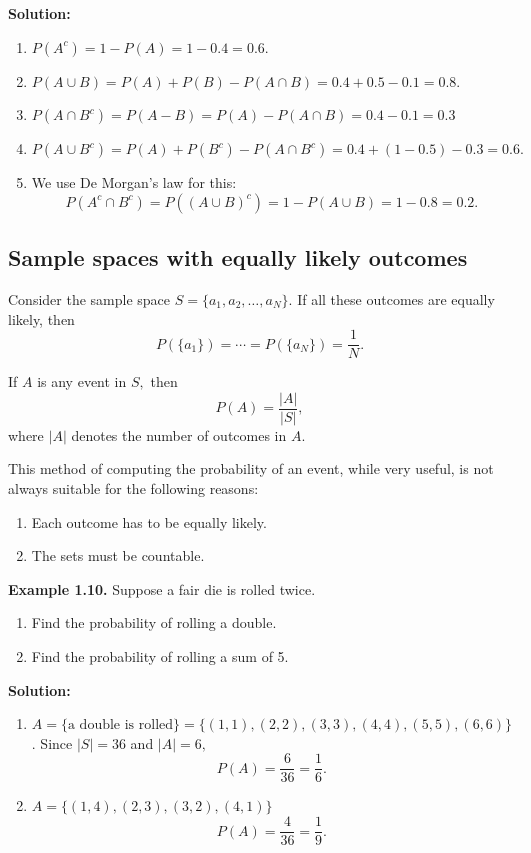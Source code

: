 \documentclass[
  12pt,
]{krantzNoCorner}
\providecommand{\tightlist}{%
  \setlength{\itemsep}{0pt}\setlength{\parskip}{0pt}}
\begin{document}
\textbf{Solution:}

\begin{enumerate}
\def\labelenumi{\arabic{enumi}.}
\tightlist
\item
  \(P(A^c)=1-P(A) = 1-0.4 = 0.6.\)
\item
  \(P(A\cup B)=P(A)+P(B)-P(A\cap B)=0.4+0.5-0.1 = 0.8.\)
\item
  \(P(A\cap B^c)=P(A-B)=P(A)-P(A\cap B)= 0.4-0.1=0.3\)
\item
  \(P(A\cup B^c)=P(A)+P(B^c)-P(A\cap B^c)=0.4+(1-0.5)-0.3 = 0.6.\)
\item
  We use De Morgan's law for this:
  \[P(A^c\cap B^c)=P((A\cup B)^c)=1-P(A\cup B )=1-0.8 = 0.2.\]
\end{enumerate}

\hypertarget{sample-spaces-with-equally-likely-outcomes}{%
\subsection{Sample spaces with equally likely outcomes}\label{sample-spaces-with-equally-likely-outcomes}}

Consider the sample space \(S=\{a_1,a_2,\dots,a_N\}.\) If all these
outcomes are equally likely, then
\[P(\{a_1\})=\cdots=P(\{a_N\})=\frac{1}{N}.\]

If \(A\) is any event in \(S,\) then \[P(A) = \frac{|A|}{|S|},\] where \(|A|\)
denotes the number of outcomes in \(A.\)

This method of computing the probability of an event, while very
useful, is not always suitable for the following reasons:

\begin{enumerate}
\def\labelenumi{\arabic{enumi}.}
\tightlist
\item
  Each outcome has to be equally likely.
\item
  The sets must be countable.
\end{enumerate}

\textbf{Example 1.10.} Suppose a fair die is rolled twice.

\begin{enumerate}
\def\labelenumi{\arabic{enumi}.}
\tightlist
\item
  Find the probability of rolling a double.
\item
  Find the probability of rolling a sum of 5.
\end{enumerate}

\textbf{Solution:}

\begin{enumerate}
\def\labelenumi{\arabic{enumi}.}
\item
  \(A=\{\text{a double is rolled}\}=\{(1,1),(2,2),(3,3),(4,4),(5,5),(6,6)\}\).
  Since \(|S|=36\) and \(|A|=6,\) \[P(A)=\frac{6}{36}=\frac{1}{6}.\]
\item
  \(A=\{(1,4), (2,3),(3,2),(4,1)\}\) \[P(A)=\frac{4}{36}=\frac{1}{9}.\]
\end{enumerate}
\end{document}
